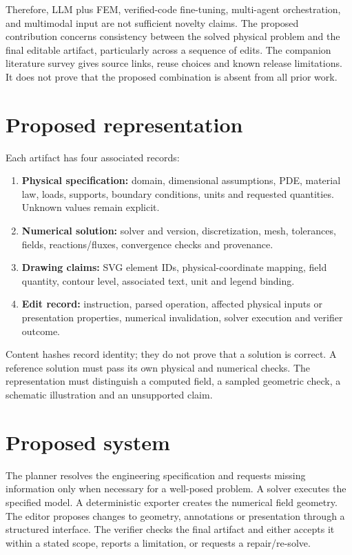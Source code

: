 \documentclass[
  11pt,
  a4paper,
]{article}
\providecommand{\tightlist}{%
  \setlength{\itemsep}{0pt}\setlength{\parskip}{0pt}}
\begin{document}
Therefore, LLM plus FEM, verified-code fine-tuning, multi-agent
orchestration, and multimodal input are not sufficient novelty claims.
The proposed contribution concerns consistency between the solved
physical problem and the final editable artifact, particularly across a
sequence of edits. The companion literature survey gives source links,
reuse choices and known release limitations. It does not prove that the
proposed combination is absent from all prior work.

\section{Proposed representation}\label{proposed-representation}

Each artifact has four associated records:

\begin{enumerate}
\def\labelenumi{\arabic{enumi}.}
\tightlist
\item
  \textbf{Physical specification:} domain, dimensional assumptions, PDE,
  material law, loads, supports, boundary conditions, units and
  requested quantities. Unknown values remain explicit.
\item
  \textbf{Numerical solution:} solver and version, discretization, mesh,
  tolerances, fields, reactions/fluxes, convergence checks and
  provenance.
\item
  \textbf{Drawing claims:} SVG element IDs, physical-coordinate mapping,
  field quantity, contour level, associated text, unit and legend
  binding.
\item
  \textbf{Edit record:} instruction, parsed operation, affected physical
  inputs or presentation properties, numerical invalidation, solver
  execution and verifier outcome.
\end{enumerate}

Content hashes record identity; they do not prove that a solution is
correct. A reference solution must pass its own physical and numerical
checks. The representation must distinguish a computed field, a sampled
geometric check, a schematic illustration and an unsupported claim.

\section{Proposed system}\label{proposed-system}

The planner resolves the engineering specification and requests missing
information only when necessary for a well-posed problem. A solver
executes the specified model. A deterministic exporter creates the
numerical field geometry. The editor proposes changes to geometry,
annotations or presentation through a structured interface. The verifier
checks the final artifact and either accepts it within a stated scope,
reports a limitation, or requests a repair/re-solve.
\end{document}
